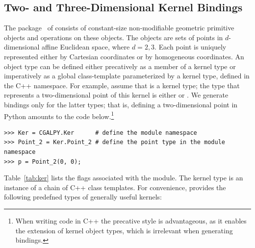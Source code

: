 \subsection{Two- and Three-Dimensional Kernel Bindings}
\label{ssec:modules:kernel}
The \iiDandiiiDGeometryKernelPackage{} package~\cite{cgal:bfghhkps-lgk23-21a} of \cgal{} consists of constant-size non-modifiable geometric primitive objects and operations on these objects. The objects are sets of points in $d$-dimensional affine Euclidean space, where $d = 2,3$.  Each point is uniquely represented either by Cartesian coordinates or by homogeneous coordinates. An object type can be defined either precatively as a member of a kernel type or imperatively as a global class-template parameterized by a kernel type, defined in the C++  namespace. For example, assume that  is a kernel type; the type that represents a two-dimensional point of this kernel is either  or .  We generate bindings only for the latter types; that is, defining a two-dimensional point in Python amounts to the code below.\footnote{When writing code in C++ the precative style is advantageous, as it enables the extension of kernel object types, which is irrelevant when generating bindings.}
\begin{lstlisting}[style=pythonStyle,basicstyle=\scriptsize]
>>> Ker = CGALPY.Ker      # define the module namespace
>>> Point_2 = Ker.Point_2 # define the point type in the module namespace
>>> p = Point_2(0, 0);
\end{lstlisting}
Table~\ref{tab:ker} lists the \cmake{} flags associated with the \iiDandiiiDGeometryKernelPackage{} module.  The kernel type is an instance of a chain of C++ class templates. For convenience, \cgal{} provides the following predefned types of generally useful kernels:
